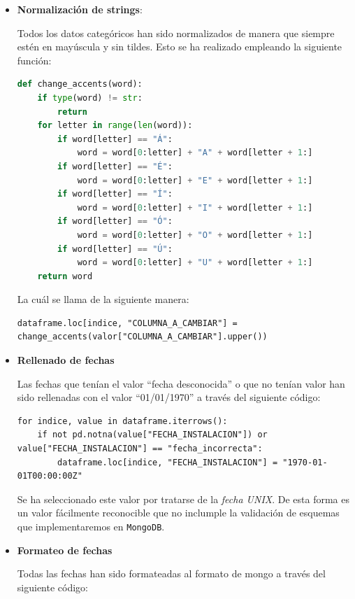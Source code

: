 \documentclass[]{article}
\begin{document}
\begin{itemize}
    \item \textbf{Normalización de strings}:

    Todos los datos categóricos han sido normalizados de manera que siempre estén en mayúscula y sin tildes. Esto se ha realizado empleando la siguiente función:

    \begin{lstlisting}[language=Python]
def change_accents(word):
    if type(word) != str:
        return
    for letter in range(len(word)):
        if word[letter] == "Á":
            word = word[0:letter] + "A" + word[letter + 1:]
        if word[letter] == "É":
            word = word[0:letter] + "E" + word[letter + 1:]
        if word[letter] == "Í":
            word = word[0:letter] + "I" + word[letter + 1:]
        if word[letter] == "Ó":
            word = word[0:letter] + "O" + word[letter + 1:]
        if word[letter] == "Ú":
            word = word[0:letter] + "U" + word[letter + 1:]
    return word
    \end{lstlisting}

    La cuál se llama de la siguiente manera:

    \begin{lstlisting}
dataframe.loc[indice, "COLUMNA_A_CAMBIAR"] = change_accents(valor["COLUMNA_A_CAMBIAR"].upper())
    \end{lstlisting}

    \item \textbf{Rellenado de fechas}

    Las fechas que tenían el valor ``fecha desconocida'' o que no tenían valor han sido rellenadas con el valor ``01/01/1970'' a través del siguiente código:

    \begin{lstlisting}
for indice, value in dataframe.iterrows():
    if not pd.notna(value["FECHA_INSTALACION"]) or value["FECHA_INSTALACION"] == "fecha_incorrecta":
        dataframe.loc[indice, "FECHA_INSTALACION"] = "1970-01-01T00:00:00Z"
    \end{lstlisting}

    Se ha seleccionado este valor por tratarse de la \textit{fecha UNIX}. De
    esta forma es un valor fácilmente reconocible que no inclumple la validación
    de esquemas que implementaremos en \texttt{MongoDB}.

    \item \textbf{Formateo de fechas}

    Todas las fechas han sido formateadas al formato de mongo a través del siguiente código:


\end{itemize}
\end{document}
